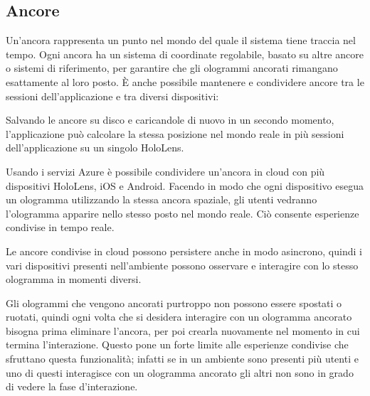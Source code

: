 \subsection{Ancore}
Un’ancora rappresenta un punto nel mondo del quale il sistema tiene traccia nel tempo. Ogni ancora ha un sistema di coordinate regolabile, basato su altre ancore o sistemi di riferimento, per garantire che gli ologrammi ancorati rimangano esattamente al loro posto. È anche possibile mantenere e condividere ancore tra le sessioni dell'applicazione e tra diversi dispositivi: 

Salvando le ancore su disco e caricandole di nuovo in un secondo momento, l'applicazione può calcolare la stessa posizione nel mondo reale in più sessioni dell'applicazione su un singolo HoloLens. 

Usando i servizi Azure è possibile condividere un'ancora in cloud con più dispositivi HoloLens, iOS e Android. Facendo in modo che ogni dispositivo esegua un ologramma utilizzando la stessa ancora spaziale, gli utenti vedranno l'ologramma apparire nello stesso posto nel mondo reale. Ciò consente esperienze condivise in tempo reale. 

Le ancore condivise in cloud possono persistere anche in modo asincrono, quindi i vari dispositivi presenti nell’ambiente possono osservare e interagire con lo stesso ologramma in momenti diversi. 

Gli ologrammi che vengono ancorati purtroppo non possono essere spostati o ruotati, quindi ogni volta che si desidera interagire con un ologramma ancorato bisogna prima eliminare l’ancora, per poi crearla nuovamente nel momento in cui termina l’interazione.
Questo pone un forte limite alle esperienze condivise che sfruttano questa funzionalità;
infatti se in un ambiente sono presenti più utenti e uno di questi interagisce con un ologramma ancorato gli altri non sono in grado di vedere la fase d'interazione.

